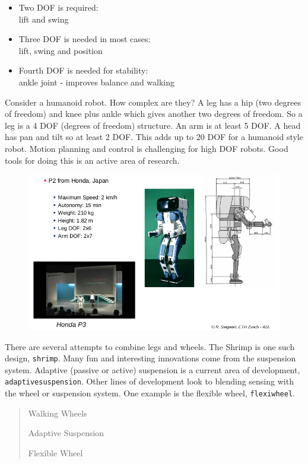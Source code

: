 \begin{itemize}
\item
  Two DOF is required:\\
  lift and swing
\item
  Three DOF is needed in most cases:\\
  lift, swing and position
\item
  Fourth DOF is needed for stability:\\
  ankle joint - improves balance and walking
\end{itemize}

Consider a humanoid robot. How complex are they? A leg has a hip (two
degrees of freedom) and knee plus ankle which gives another two degrees
of freedom. So a leg is a 4 DOF (degrees of freedom) structure. An arm
is at least 5 DOF. A head has pan and tilt so at least 2 DOF. This adds
up to 20 DOF for a humanoid style robot. Motion planning and control is
challenging for high DOF robots. Good tools for doing this is an active
area of research.

\begin{figure}
\centering
\includegraphics{MotionFigures/humanoid.png}
\caption{}
\end{figure}

There are several attempts to combine legs and wheels. The Shrimp is one
such design, \texttt{shrimp}. Many fun and interesting innovations come
from the suspension system. Adaptive (passive or active) suspension is a
current area of development, \texttt{adaptivesuspension}. Other lines of
development look to blending sensing with the wheel or suspension
system. One example is the flexible wheel, \texttt{flexiwheel}.

\begin{quote}
Walking Wheels

Adaptive Suspension

Flexible Wheel
\end{quote}
